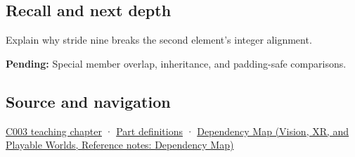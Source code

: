 \subsection{Recall and next depth}\label{appendix-f52f8c5a3afd-recall-and-next-depth}

Explain why stride nine breaks the second element's integer alignment.

\textbf{Pending:} Special member overlap, inheritance, and padding-safe comparisons.

\subsection{Source and navigation}\label{appendix-f52f8c5a3afd-source-and-navigation}

\hyperref[01-foundations-i-ch002-where-the-bytes-live]{C003 teaching chapter} · \hyperref[appendix-fd090d982a15-m003---parts-41-60]{Part definitions} · \href{../07-Vision-XR-and-Playable-Worlds/main.pdf\#nameddest=appendix-4ad47bdd269a}{Dependency Map (Vision, XR, and Playable Worlds, Reference notes: Dependency Map)}
